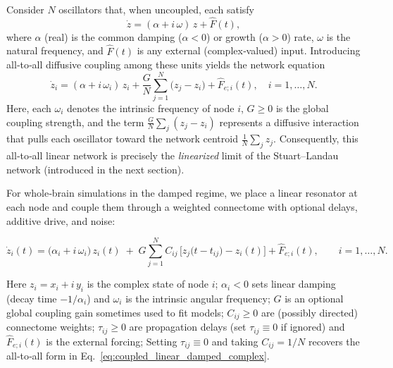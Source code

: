 \documentclass[12pt]{article}
\numberwithin{equation}{section}
\begin{document}
Consider \(N\) oscillators that, when uncoupled, each satisfy  
\[
    \dot{z} = (\alpha + i\,\omega)\,z + \hat F(t),
\]
where \(\alpha\) (real) is the common damping (\(\alpha<0\)) or growth (\(\alpha>0\)) rate, \(\omega\) is the natural frequency, and \(\hat F(t)\) is any external (complex‐valued) input.  Introducing all‐to‐all diffusive coupling among these units yields the network equation  
\begin{equation}
    \dot{z}_{i} 
    = (\alpha + i\,\omega_{i})\,z_{i} 
    + \frac{G}{N}\sum_{j=1}^{N}\bigl(z_{j} - z_{i}\bigr) 
    +  \hat F_{e;i}(t),
    \quad
    i = 1,\dots, N.
    \label{eq:coupled_linear_damped_complex}
\end{equation}
Here, each \(\omega_{i}\) denotes the intrinsic frequency of node \(i\), \(G\ge0\) is the global coupling strength, and the term \(\tfrac{G}{N}\sum_{j}(z_{j} - z_{i})\) represents a diffusive interaction that pulls each oscillator toward the network centroid \(\tfrac{1}{N}\sum_{j}z_{j}\).    Consequently, this all‐to‐all linear network is precisely the \emph{linearized} limit of the Stuart–Landau network (introduced in the next section). 

\noindent
For whole‑brain simulations in the damped regime, we place a linear resonator at each node and couple them through a weighted connectome with optional delays, additive drive, and noise:
\begin{tcolorbox}[
  colback=gray!5,
  colframe=gray!5,   %
  boxrule=0pt,       %
  enhanced, sharp corners,
  left=4pt,right=4pt,top=3pt,bottom=3pt,
  boxsep=2pt,
  before skip=6pt, after skip=6pt
]
\begin{equation}
\dot{z}_i(t)
=
\bigl(\alpha_i + i\,\omega_i\bigr)\,z_i(t)
\;+\;
G\sum_{j=1}^{N} C_{ij}\,\bigl[z_j\!\bigl(t-t_{ij}\bigr)-z_i(t)\bigr]
+  \hat F_{e;i}(t),
\qquad i=1,\dots,N.
\label{eq:linear_damped_connectome}
\end{equation}
\end{tcolorbox}

Here $z_i=x_i+i\,y_i$ is the complex state of node $i$; $\alpha_i<0$ sets linear damping (decay time $-\!1/\alpha_i$) and $\omega_i$ is the intrinsic angular frequency; $G$ is an optional global coupling gain sometimes used to fit models; $C_{ij}\!\ge\!0$ are (possibly directed) connectome weights; $\tau_{ij}\!\ge\!0$ are propagation delays (set $\tau_{ij}\!\equiv\!0$ if ignored) and $ \hat F_{e;i}(t)$ is the external forcing; Setting $\tau_{ij}\!\equiv\!0$ and taking $C_{ij}\!=\!1/N$ recovers the all‑to‑all form in Eq.~\eqref{eq:coupled_linear_damped_complex}.
\end{document}
